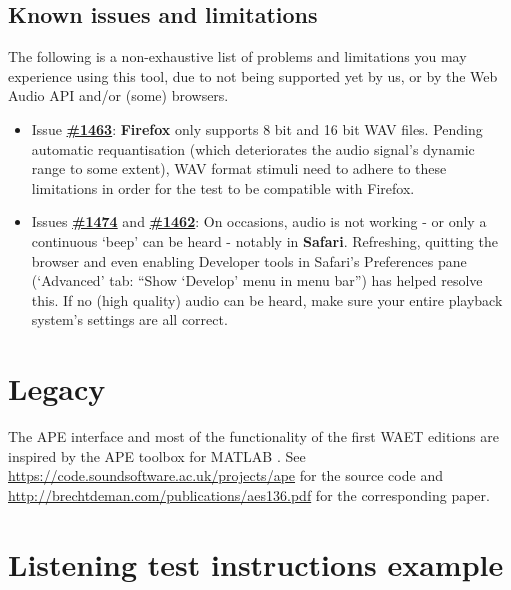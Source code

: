 \documentclass[11pt, oneside]{article}   	%
\begin{document}
	\subsection{Known issues and limitations}
	\label{sec:knownissues}

		The following is a non-exhaustive list of problems and limitations you may experience using this tool, due to not being supported yet by us, or by the Web Audio API and/or (some) browsers. 

		\begin{itemize}
			\item Issue \href{https://code.soundsoftware.ac.uk/issues/1463}{\textbf{\#1463}}: \textbf{Firefox} only supports 8 bit and 16 bit WAV files. Pending automatic requantisation (which deteriorates the audio signal's dynamic range to some extent), WAV format stimuli need to adhere to these limitations in order for the test to be compatible with Firefox. 
			\item Issues \href{https://code.soundsoftware.ac.uk/issues/1474}{\textbf{\#1474}} and \href{https://code.soundsoftware.ac.uk/issues/1462}{\textbf{\#1462}}: On occasions, audio is not working - or only a continuous `beep' can be heard - notably in \textbf{Safari}. Refreshing, quitting the browser and even enabling Developer tools in Safari's Preferences pane (`Advanced' tab: ``Show `Develop' menu in menu bar'') has helped resolve this. If no (high quality) audio can be heard, make sure your entire playback system's settings are all correct. 
		\end{itemize}

\clearpage

{}


\clearpage
\appendix

\section{Legacy}
	The APE interface and most of the functionality of the first WAET editions are inspired by the APE toolbox for MATLAB \cite{ape}. See \url{https://code.soundsoftware.ac.uk/projects/ape} for the source code and \url{http://brechtdeman.com/publications/aes136.pdf} for the corresponding paper. 

\clearpage

\section{Listening test instructions example}
\end{document}

